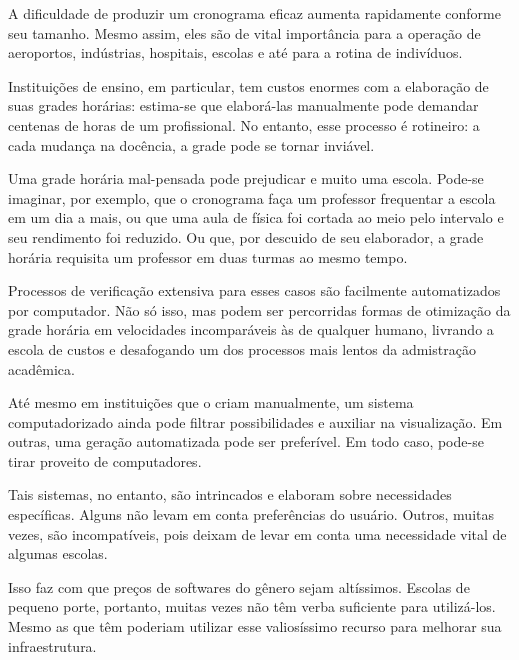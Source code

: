 \documentclass[12pt,a4paper]{article}
\begin{document}
			\par A dificuldade de produzir um cronograma eficaz aumenta rapidamente conforme seu tamanho. Mesmo assim, eles são de vital importância para a operação de aeroportos, indústrias, hospitais, escolas e até para a rotina de indivíduos.

			\par Instituições de ensino, em particular, tem custos enormes com a elaboração de suas grades horárias: estima-se que elaborá-las manualmente pode demandar centenas de horas \cite{appleby} de um profissional. No entanto, esse processo é rotineiro: a cada mudança na docência, a grade pode se tornar inviável.

			\par Uma grade horária mal-pensada pode prejudicar e muito uma escola. Pode-se imaginar, por exemplo, que o cronograma faça um professor frequentar a escola em um dia a mais, ou que uma aula de física foi cortada ao meio pelo intervalo e seu rendimento foi reduzido. Ou que, por descuido de seu elaborador, a grade horária requisita um professor em duas turmas ao mesmo tempo.

			\par Processos de verificação extensiva para esses casos são facilmente automatizados por computador. Não só isso, mas podem ser percorridas formas de otimização da grade horária em velocidades incomparáveis às de qualquer humano, livrando a escola de custos e desafogando um dos processos mais lentos da admistração acadêmica.

			\par Até mesmo em instituições que o criam manualmente, um sistema computadorizado ainda pode filtrar possibilidades e auxiliar na visualização. Em outras, uma geração automatizada pode ser preferível. Em todo caso, pode-se tirar proveito de computadores.

			\par Tais sistemas, no entanto, são intrincados e elaboram sobre necessidades específicas. Alguns não levam em conta preferências do usuário\cite{nikita}. Outros, muitas vezes, são incompatíveis, pois deixam de levar em conta uma necessidade vital de algumas escolas.

			\par Isso faz com que preços de softwares do gênero sejam altíssimos. Escolas de pequeno porte, portanto, muitas vezes não têm verba suficiente para utilizá-los. Mesmo as que têm poderiam utilizar esse valiosíssimo recurso para melhorar sua infraestrutura.
\end{document}
